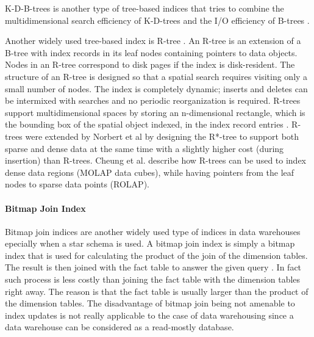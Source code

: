 \documentclass[12pt,a4paper]{article}
\begin{document}
K-D-B-trees \cite{robinson1981kdb} is another type of tree-based indices that tries to combine the multidimensional search efficiency of K-D-trees
\cite{bentley1975multidimensional} and the I/O efficiency of B-trees \cite{bayer1970organization}.

Another widely used tree-based index is R-tree \cite{guttman1984rtrees}. An R-tree is an extension of a B-tree with index records in its leaf nodes
containing pointers to data objects. Nodes in an R-tree correspond to disk pages if the index is disk-resident. The structure of an R-tree is designed so that a
spatial search requires visiting only a small number of nodes. The index is completely dynamic; inserts and deletes can be intermixed with searches and no
periodic reorganization is required. R-trees support multidimensional spaces by storing an n-dimensional rectangle, which is the bounding box of the spatial
object indexed, in the index record entries \cite{guttman1984rtrees}. R-trees were extended by Norbert et al \cite{norbert1990rstree} by designing the R*-tree
to support both sparse and dense data at the same time with a slightly higher cost (during insertion) than R-trees. Cheung et al. \cite{cheung2001towards}
describe how R-trees can be used to index dense data regions (MOLAP data cubes), while having pointers from the leaf nodes to sparse data points (ROLAP).

\paragraph{Bitmap Join Index}
Bitmap join indices are another widely used type of indices in data warehouses epecially when a star schema is used. A bitmap join index is simply a bitmap
index that is used for calculating the product of the join of the dimension tables. The result is then joined with the fact table to answer the given query
\cite{oneil1995multi}. In fact such process is less costly than joining the fact table with the dimension tables right away. The reason is that the fact table
is usually larger than the product of the dimension tables. The disadvantage of bitmap join being not amenable to index updates is not really applicable to the
case of data warehousing since a data warehouse can be considered as a read-mostly database.
\end{document}
